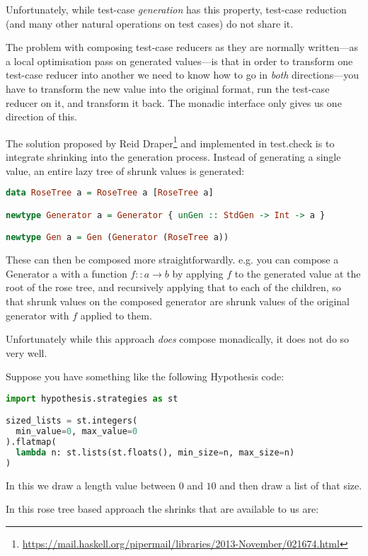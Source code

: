 Unfortunately,
while test-case \emph{generation} has this property,
test-case reduction (and many other natural operations on test cases) do not share it.

The problem with composing test-case reducers as they are normally written---as
a local optimisation pass on generated values---is
that in order to transform one test-case reducer into another we need to know how to go in \emph{both} directions---you
have to transform the new value into the original format,
run the test-case reducer on it,
and transform it back.
The monadic interface only gives us one direction of this.

The solution proposed by Reid Draper\footnote{\url{https://mail.haskell.org/pipermail/libraries/2013-November/021674.html}} and implemented in test.check is to integrate shrinking into the generation process.
Instead of generating a single value,
an entire lazy tree of shrunk values is generated:

\begin{lstlisting}[language=Haskell]
data RoseTree a = RoseTree a [RoseTree a]

newtype Generator a = Generator { unGen :: StdGen -> Int -> a }

newtype Gen a = Gen (Generator (RoseTree a))
\end{lstlisting}

These can then be composed more straightforwardly.
e.g. you can compose a Generator a with a function \(f :: a \to b\) by applying \(f\) to the generated value at the root of the rose tree,
and recursively applying that to each of the children,
so that shrunk values on the composed generator are shrunk values of the original generator with \(f\) applied to them.

Unfortunately while this approach \emph{does} compose monadically,
it does not do so very well.

Suppose you have something like the following Hypothesis code:

\begin{lstlisting}[language=Python]
import hypothesis.strategies as st

sized_lists = st.integers(
  min_value=0, max_value=0
).flatmap(
  lambda n: st.lists(st.floats(), min_size=n, max_size=n)
)
\end{lstlisting}

In this we draw a length value between \(0\) and \(10\) and then draw a list of that size.

In this rose tree based approach the shrinks that are available to us are:

